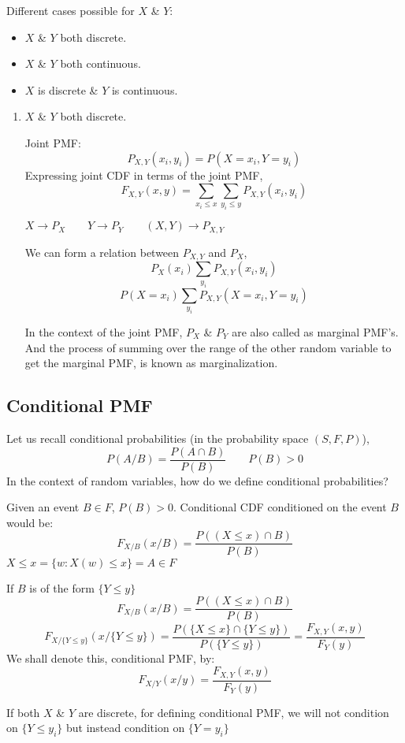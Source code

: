 \documentclass{article}
\begin{document}
Different cases possible for $X$ \& $Y$:
\begin{itemize}
    \item $X$ \& $Y$ both discrete.
    \item $X$ \& $Y$ both continuous.
    \item $X$ is discrete \& $Y$ is continuous.
\end{itemize}

\begin{enumerate}
    \item $X$ \& $Y$ both discrete.

    Joint PMF:
    $$ P_{X,Y}(x_i,y_i)= P(X= x_i,Y= y_i)$$
    Expressing joint CDF in terms of the joint PMF,
    $$ F_{X,Y}(x,y) = \sum_{x_i \leq x} \sum_{y_i \leq y} P_{X,Y}(x_i,y_i)$$

    $X\to P_X \qquad Y \to P_Y \qquad (X,Y) \to P_{X,Y}$

    We can form a relation between $P_{X,Y}$ and $P_X$,
    $$ P_X(x_i) \sum_{y_i} P_{X,Y}(x_i,y_i)$$
    $$ P(X= x_i) \sum_{y_i} P_{X,Y}(X=x_i,Y=y_i)$$

    In the context of the joint PMF, $P_X$ \& $P_Y$ are also called as marginal PMF's.
    And the process of summing over the range of the other random variable to get the marginal PMF, is known as marginalization.
\end{enumerate}

\subsection{Conditional PMF}

Let us recall conditional probabilities (in the probability space $(S,F,P)$),
$$ P(A/B)= \frac{P(A \cap B)}{P(B)} \qquad P(B)>0$$
In the context of random variables, how do we define conditional probabilities?

Given an event $B \in F$, $P(B)>0$. Conditional CDF conditioned on the event $B$ would be:
$$ F_{X/B}(x/B)= \frac{P( (X \leq x)\cap B)}{P(B)}$$
$X \leq x= \{ w: X(w) \leq x\}= A \in F$

If $B$ is of the form $\{ Y \leq y \}$
$$ F_{X/B}(x/B)= \frac{P((X \leq x) \cap B)}{P(B)}$$
$$ F_{X/\{ Y \leq y \}}(x / \{ Y \leq y \})= \frac{P(\{ X \leq x \} \cap \{ Y \leq y \})}{P(\{ Y \leq y \})}= \frac{F_{X,Y}(x,y)}{F_Y (y)}$$
We shall denote this, conditional PMF, by:
$$ F_{X/Y}(x/y)= \frac{F_{X,Y}(x,y)}{F_Y (y)}$$

If both $X$ \& $Y$ are discrete, for defining conditional PMF, we will not condition on $\{ Y \leq y_i \} $ but instead condition on $\{ Y = y_i \}$
\end{document}
